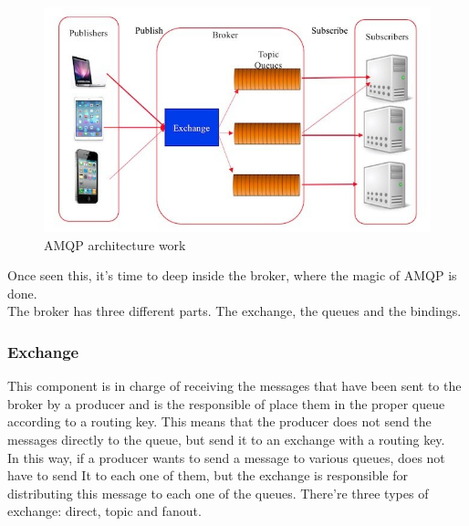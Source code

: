 \documentclass[12pt]{article}
\begin{document}
\begin{figure}[H]
    \centering
    \includegraphics[scale = 0.7]{Images/AMQP-architecture-34.png}
    \caption{AMQP architecture work}
    \label{fig:AMQP_architecture}
\end{figure}

Once seen this, it's time to deep inside the broker, where the magic of AMQP is done.\\
The broker has three different parts. The exchange, the queues and the bindings.

\subsubsection*{Exchange}
This component is in charge of receiving the messages that have been sent to the broker by a producer and is the responsible of place them in the proper queue according to a routing key. This means that the producer does not send the messages directly to the queue, but send it to an exchange with a routing key.\\
In this way, if a producer wants to send a message to various queues, does not have to send It to each one of them, but the exchange is responsible for distributing this message to each one of the queues. There're three types of exchange: direct, topic and fanout.\\
\end{document}
